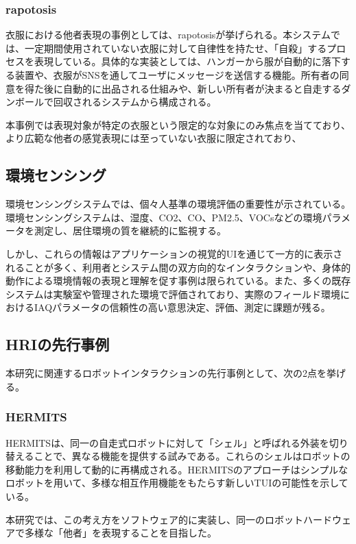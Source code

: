 \documentclass{cuxarticle}
\begin{document}
\subsubsection{rapotosis}
衣服における他者表現の事例としては、rapotosis\cite{--ソンヨン}が挙げられる。本システムでは、一定期間使用されていない衣服に対して自律性を持たせ、「自殺」するプロセスを表現している。具体的な実装としては、ハンガーから服が自動的に落下する装置や、衣服がSNSを通してユーザにメッセージを送信する機能。所有者の同意を得た後に自動的に出品される仕組みや、新しい所有者が決まると自走するダンボールで回収されるシステムから構成される。

本事例では表現対象が特定の衣服という限定的な対象にのみ焦点を当てており、より広範な他者の感覚表現には至っていない衣服に限定されており、

\subsection{環境センシング}
環境センシングシステムでは、個々人基準の環境評価の重要性が示されている\cite{Saini-2020-IndoorAirQualityMonitoring}。環境センシングシステムは、湿度、CO2、CO、PM2.5、VOCsなどの環境パラメータを測定し、居住環境の質を継続的に監視する。

しかし、これらの情報はアプリケーションの視覚的UIを通じて一方的に表示されることが多く、利用者とシステム間の双方向的なインタラクションや、身体的動作による環境情報の表現と理解を促す事例は限られている。また、多くの既存システムは実験室や管理された環境で評価されており、実際のフィールド環境におけるIAQパラメータの信頼性の高い意思決定、評価、測定に課題が残る。

\subsection{HRIの先行事例}
本研究に関連するロボットインタラクションの先行事例として、次の2点を挙げる。

\subsubsection{HERMITS}
HERMITS\cite{--HERMITSProceedings33rdAnnual}は、同一の自走式ロボットに対して「シェル」と呼ばれる外装を切り替えることで、異なる機能を提供する試みである。これらのシェルはロボットの移動能力を利用して動的に再構成される。HERMITSのアプローチはシンプルなロボットを用いて、多様な相互作用機能をもたらす新しいTUIの可能性を示している。

本研究では、この考え方をソフトウェア的に実装し、同一のロボットハードウェアで多様な「他者」を表現することを目指した。
\end{document}
